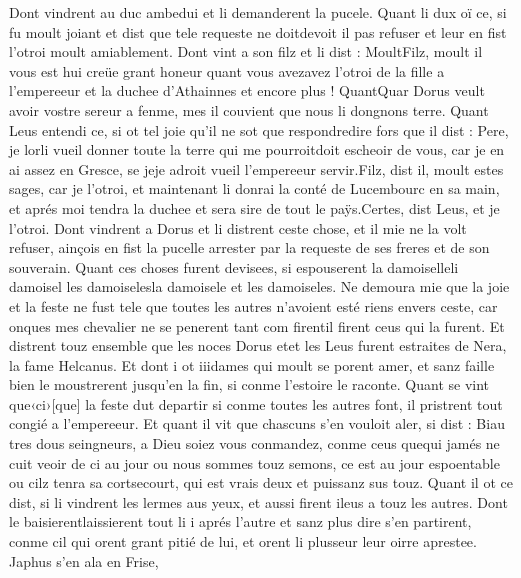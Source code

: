 \documentclass{article}
\begin{document}
\begin{pages}
   Dont vindrent au duc ambedui 
   et li demanderent la pucele. Quant li dux oï ce, 
   si fu moult joiant et dist que tele requeste ne 
      doitdevoit il pas refuser et 
      leur en fist l’otroi moult amiablement. Dont vint a son filz et li dist :
   MoultFilz, moult il vous est 
      hui creüe grant honeur quant vous 
      avezavez l'otroi de
       la fille a l’empereeur 
      et la duchee d’Athainnes et encore plus ! 
      QuantQuar Dorus veult 
      avoir vostre sereur a fenme, mes il couvient que nous li dongnons terre.
   Quant Leus entendi ce, si ot tel joie qu’il ne sot que 
   respondredire fors que il dist :
   Pere, je lorli 
      vueil donner toute la terre qui me 
      pourroitdoit escheoir de vous, 
      car je en ai assez en Gresce, 
      se jeje adroit vueil 
      l’empereeur servir.Filz, dist il, moult estes sages, car je l’otroi, et maintenant li donrai la conté 
   de Lucembourc en sa main, et aprés moi tendra la duchee et sera sire de tout le paÿs.Certes, dist Leus, et je l’otroi.
   Dont vindrent a Dorus et li distrent ceste chose, 
   et il mie ne la volt refuser, ainçois en fist la pucelle arrester par la requeste de 
   ses freres et de son souverain. \pend       
\pstart Quant ces choses furent devisees, si espouserent 
   la damoiselleli damoisel 
      les damoiselesla damoisele et les damoiseles. 
   Ne demoura mie que la joie et la feste ne fust tele que toutes les autres n’avoient esté riens envers ceste, 
   car onques mes chevalier ne se penerent tant com firentil firent 
   ceus qui la furent. 
   Et distrent touz ensemble que les noces Dorus 
      etet les Leus furent 
   estraites de Nera, la fame Helcanus. 
   Et dont i ot iiidames qui moult se porent amer, et sanz 
   faille bien le moustrerent jusqu’en la fin, si conme l’estoire le raconte. 
   Quant se vint que‹ci›[que] la feste dut 
   departir si conme toutes les autres font, il pristrent tout congié a l’empereeur. 
   Et quant il vit que chascuns s’en vouloit aler, si dist :
   Biau tres dous seingneurs, a Dieu soiez vous conmandez, conme ceus 
      quequi jamés ne cuit veoir de ci au jour ou nous sommes touz semons, 
      ce est au jour espoentable ou cilz tenra sa cortsecourt, 
      qui est vrais deux et puissanz sus touz. \pend
\pstart Quant il ot ce dist, si li vindrent les lermes aus yeux, 
   et aussi firent ileus a touz les autres. 
   Dont le baisierentlaissierent tout li i aprés l’autre 
   et sanz plus dire s’en partirent, conme cil qui orent grant pitié de lui, 
   et orent li plusseur leur oirre aprestee. Japhus s’en ala en Frise, 

\end{pages}
\end{document}

